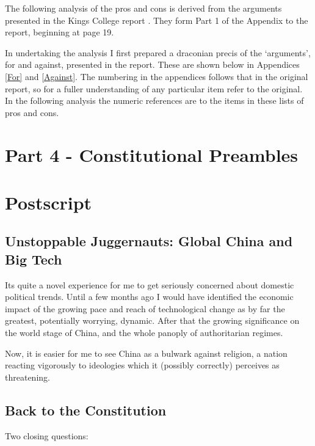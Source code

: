 \documentclass[14pt,titlepage]{extarticle}
\begin{document}
The following analysis of the pros and cons is derived from the arguments presented in the Kings College report \cite{rbjw003}.
They form Part 1 of the Appendix to the report, beginning at page 19.

In undertaking the analysis I first prepared a draconian precis of the `arguments', for and against, presented in the report.
These are shown below in Appendices \ref{For} and \ref{Against}.
The numbering in the appendices follows that in the original report, so for a fuller understanding of any particular item refer to the original.
In the following analysis the numeric references are to the items in these lists of pros and cons.

\section{Part 4 - Constitutional Preambles}\label{part4}

\section{Postscript}

\subsection{Unstoppable Juggernauts: Global China and Big Tech}

Its quite a novel experience for me to get seriously concerned about domestic political trends.
Until a few months ago I would have identified the economic impact of the growing pace and reach of technological change as by far the greatest, potentially worrying, dynamic.
After that the growing significance on the world stage of China, and the whole panoply of authoritarian regimes.

Now, it is easier for me to see China as a bulwark against religion, a nation reacting vigorously to ideologies which it (possibly correctly) perceives as threatening.

\subsection{Back to the Constitution}

Two closing questions:
\end{document}
